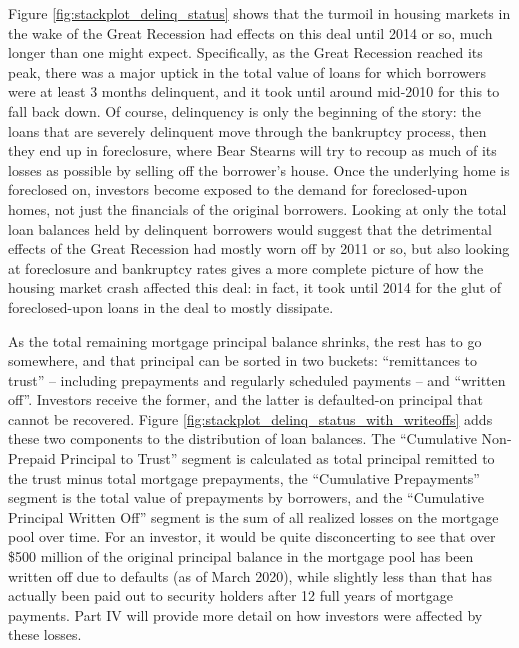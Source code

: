 \documentclass[12pt]{article}
\begin{document}
Figure \ref{fig:stackplot_delinq_status} shows that the turmoil in housing markets in the wake of the Great Recession had effects on this deal until 2014 or so, much longer than one might expect. Specifically, as the Great Recession reached its peak, there was a major uptick in the total value of loans for which borrowers were at least 3 months delinquent, and it took until around mid-2010 for this to fall back down. Of course, delinquency is only the beginning of the story: the loans that are severely delinquent move through the bankruptcy process, then they end up in foreclosure, where Bear Stearns will try to recoup as much of its losses as possible by selling off the borrower’s house. Once the underlying home is foreclosed on, investors become exposed to the demand for foreclosed-upon homes, not just the financials of the original borrowers. Looking at only the total loan balances held by delinquent borrowers would suggest that the detrimental effects of the Great Recession had mostly worn off by 2011 or so, but also looking at foreclosure and bankruptcy rates gives a more complete picture of how the housing market crash affected this deal: in fact, it took until 2014 for the glut of foreclosed-upon loans in the deal to mostly dissipate.

	As the total remaining mortgage principal balance shrinks, the rest has to go somewhere, and that principal can be sorted in two buckets: “remittances to trust” – including prepayments and regularly scheduled payments – and “written off”. Investors receive the former, and the latter is defaulted-on principal that cannot be recovered. Figure \ref{fig:stackplot_delinq_status_with_writeoffs} adds these two components to the distribution of loan balances. The “Cumulative Non-Prepaid Principal to Trust” segment is calculated as total principal remitted to the trust minus total mortgage prepayments, the “Cumulative Prepayments” segment is the total value of prepayments by borrowers, and the “Cumulative Principal Written Off” segment is the sum of all realized losses on the mortgage pool over time. For an investor, it would be quite disconcerting to see that over \$500 million of the original principal balance in the mortgage pool has been written off due to defaults (as of March 2020), while slightly less than that has actually been paid out to security holders after 12 full years of mortgage payments. Part IV will provide more detail on how investors were affected by these losses.
\end{document}
